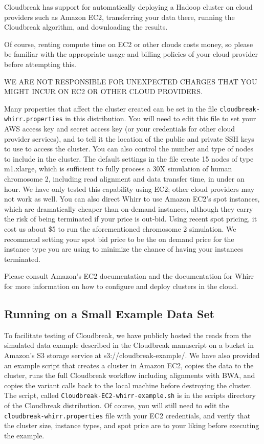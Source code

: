 \documentclass[11pt]{article}
\begin{document}
Cloudbreak has support for automatically deploying a Hadoop cluster on
cloud providers such as Amazon EC2, transferring your data there, running the Cloudbreak algorithm, and
downloading the results.

Of course, renting compute time on EC2 or other clouds costs money, so please be
familiar with the appropriate usage and billing policies of your cloud provider
before attempting this.

WE ARE NOT RESPONSIBLE FOR UNEXPECTED CHARGES THAT YOU MIGHT INCUR ON EC2 OR
OTHER CLOUD PROVIDERS.

Many properties that affect the cluster created can be set in the file
\texttt{cloudbreak-whirr.properties} in this distribution. You will need to edit this file
to set your AWS access key and secret access key (or your credentials for other
cloud provider services), and to tell it the location of the public and
private SSH keys to use to access the cluster. You can also control the number
and type of nodes to include in the cluster. The default settings in the file
create 15 nodes of type m1.xlarge, which is sufficient to fully process a 30X
simulation of human chromosome 2, including read alignment and data transfer time,
in under an hour. We have only tested this capability using EC2; other cloud providers
may not work as well. You can also direct Whirr to use Amazon EC2's spot instances, which are
dramatically cheaper than on-demand instances, although they carry the risk of
being terminated if your price is out-bid. Using recent spot pricing, it cost
us about \$5 to run the aforementioned chromosome 2 simulation. We recommend
setting your spot bid price to be the on demand price for the instance type you
are using to minimize the chance of having your instances terminated.

Please consult Amazon's EC2 documentation and the documentation for Whirr for
more information on how to configure and deploy clusters in the cloud.

\subsection{Running on a Small Example Data Set}
\label{runningonasmallexampledataset}

To facilitate testing of Cloudbreak, we have publicly hosted the reads from the simulated
data example described in the Cloudbreak manuscript on a bucket in Amazon's S3 storage
 service at s3:/\slash cloudbreak-example\slash . We have also provided an example script that creates
 a cluster in Amazon EC2, copies the data to the cluster, runs the full Cloudbreak
 workflow including alignments with BWA, and copies the variant calls back to the
 local machine before destroying the cluster. The script, called \texttt{Cloudbreak-EC2-whirr-example.sh}
 is in the scripts directory of the Cloudbreak distribution. Of course, you will still
 need to edit the \texttt{cloudbreak-whirr.properties} file with your EC2 credentials, and verify
 that the cluster size, instance types, and spot price are to your liking before
 executing the example.
\end{document}
